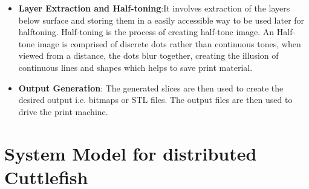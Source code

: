 \begin{itemize}
\item \textbf{Layer Extraction and Half-toning}:It involves extraction of the layers below surface and storing them in a easily accessible way to be used later for halftoning. Half-toning is the process of creating half-tone image. An Half-tone image is comprised of discrete dots rather than continuous tones, when viewed from a distance, the dots blur together, creating the illusion of continuous lines and shapes which helps to save print material. \newline

\item \textbf{Output Generation}: The generated slices are then used to create the desired output i.e. bitmaps or STL files. The output files are then used to drive the print machine. \newline

\end{itemize} 

\section{System Model for distributed Cuttlefish}
 


